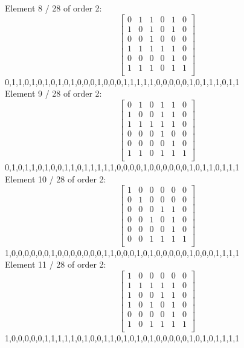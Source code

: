 Element     8 / 28 of order 2:
$$
\left[
\begin{array}{*{6}{r}}
0 & 1 & 1 & 0 & 1 & 0\\
1 & 0 & 1 & 0 & 1 & 0\\
0 & 0 & 1 & 0 & 0 & 0\\
1 & 1 & 1 & 1 & 1 & 0\\
0 & 0 & 0 & 0 & 1 & 0\\
1 & 1 & 1 & 0 & 1 & 1\\
\end{array}
\right]
$$
0,1,1,0,1,0,1,0,1,0,1,0,0,0,1,0,0,0,1,1,1,1,1,0,0,0,0,0,1,0,1,1,1,0,1,1\\
Element     9 / 28 of order 2:
$$
\left[
\begin{array}{*{6}{r}}
0 & 1 & 0 & 1 & 1 & 0\\
1 & 0 & 0 & 1 & 1 & 0\\
1 & 1 & 1 & 1 & 1 & 0\\
0 & 0 & 0 & 1 & 0 & 0\\
0 & 0 & 0 & 0 & 1 & 0\\
1 & 1 & 0 & 1 & 1 & 1\\
\end{array}
\right]
$$
0,1,0,1,1,0,1,0,0,1,1,0,1,1,1,1,1,0,0,0,0,1,0,0,0,0,0,0,1,0,1,1,0,1,1,1\\
Element    10 / 28 of order 2:
$$
\left[
\begin{array}{*{6}{r}}
1 & 0 & 0 & 0 & 0 & 0\\
0 & 1 & 0 & 0 & 0 & 0\\
0 & 0 & 0 & 1 & 1 & 0\\
0 & 0 & 1 & 0 & 1 & 0\\
0 & 0 & 0 & 0 & 1 & 0\\
0 & 0 & 1 & 1 & 1 & 1\\
\end{array}
\right]
$$
1,0,0,0,0,0,0,1,0,0,0,0,0,0,0,1,1,0,0,0,1,0,1,0,0,0,0,0,1,0,0,0,1,1,1,1\\
Element    11 / 28 of order 2:
$$
\left[
\begin{array}{*{6}{r}}
1 & 0 & 0 & 0 & 0 & 0\\
1 & 1 & 1 & 1 & 1 & 0\\
1 & 0 & 0 & 1 & 1 & 0\\
1 & 0 & 1 & 0 & 1 & 0\\
0 & 0 & 0 & 0 & 1 & 0\\
1 & 0 & 1 & 1 & 1 & 1\\
\end{array}
\right]
$$
1,0,0,0,0,0,1,1,1,1,1,0,1,0,0,1,1,0,1,0,1,0,1,0,0,0,0,0,1,0,1,0,1,1,1,1\\

